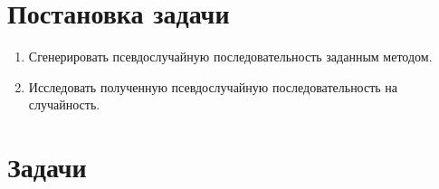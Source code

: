 \documentclass[spec, och, labwork]{shiza}
\begin{document}
\tableofcontents

\section{Постановка задачи}

\begin{enumerate}
  \item Сгенерировать псевдослучайную последовательность заданным методом.
  \item Исследовать полученную псевдослучайную последовательность на случайность.
\end{enumerate}

\section{Задачи}
\end{document}
